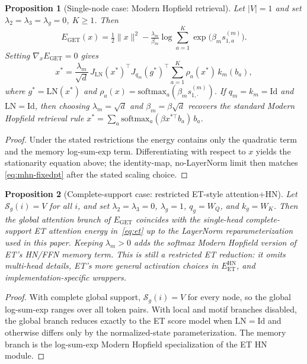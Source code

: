 \documentclass[11pt,a4paper]{article}
\newtheorem{proposition}{Proposition}
\begin{document}
\begin{proposition}[Single-node case: Modern Hopfield retrieval]
\label{prop:single-node}
Let $|V|=1$ and set $\lambda_2=\lambda_3=\lambda_g=0$, $K\ge 1$. Then
\begin{equation}
  E_{\mathrm{GET}}(x)
  = \tfrac{1}{2}\|x\|^2
    - \tfrac{\lambda_m}{\beta_m}\log\sum_{a=1}^{K}
      \exp\!\bigl(\beta_m s^{(m)}_{1,a}\bigr).
\end{equation}
Setting $\nabla_x E_{\mathrm{GET}}=0$ gives
\begin{equation}
  x^* = \frac{\lambda_m}{\sqrt d}\,{J_{\mathrm{LN}}(x^*)}^\top
        {J_{q_m}(g^*)}^\top\sum_{a=1}^{K}\rho_a(x^*)\,k_m(b_a),
  \label{eq:single-node-fixedpt}
\end{equation}
where $g^*=\mathrm{LN}(x^*)$ and
$\rho_a(x)=\mathrm{softmax}_a(\beta_m s^{(m)}_{1,\cdot})$. If
$q_m=k_m=\mathrm{Id}$ and $\mathrm{LN}=\mathrm{Id}$, then choosing
$\lambda_m=\sqrt d$ and $\beta_m=\beta\sqrt d$ recovers the standard Modern
Hopfield retrieval rule
$x^*=\sum_a \mathrm{softmax}_a(\beta x^{*\top}b_a)\,b_a$.
\end{proposition}

\begin{proof}
Under the stated restrictions the energy contains only the quadratic term and
the memory log-sum-exp term. Differentiating with respect to $x$ yields the
stationarity equation above; the identity-map, no-LayerNorm limit then matches
\eqref{eq:mhn-fixedpt} after the stated scaling choice.
\end{proof}

\begin{proposition}[Complete-support case: restricted ET-style attention+HN]
\label{prop:et}
Let $\mathcal S_g(i)=V$ for all $i$, and set
$\lambda_2=\lambda_3=0$, $\lambda_g=1$, $q_g=W_Q$, and $k_g=W_K$. Then the
global attention branch of $E_{\mathrm{GET}}$ coincides with the single-head
complete-support ET attention energy in~\eqref{eq:et} up to the LayerNorm
reparameterization used in this paper. Keeping $\lambda_m>0$ adds the softmax
Modern Hopfield version of ET's HN/FFN memory term. This is still a restricted
ET reduction: it omits multi-head details, ET's more general activation
choices in $E_{\mathrm{ET}}^{\mathrm{HN}}$, and implementation-specific
wrappers.
\end{proposition}

\begin{proof}
With complete global support, $\mathcal S_g(i)=V$ for every node, so the
global log-sum-exp ranges over all token pairs. With local and motif branches
disabled, the global branch reduces exactly to the ET score model when
$\mathrm{LN}=\mathrm{Id}$ and otherwise differs only by the normalized-state
parameterization. The memory branch is the log-sum-exp Modern Hopfield
specialization of the ET HN module.
\end{proof}
\end{document}
